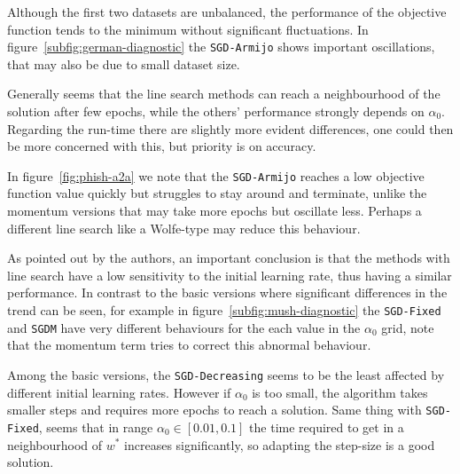 
Although the first two datasets are unbalanced, the performance of the objective function tends to the minimum without significant fluctuations. In figure~\ref{subfig:german-diagnostic} the \texttt{SGD-Armijo} shows important oscillations, that may also be due to small dataset size.


Generally seems that the line search methods can reach a neighbourhood of the solution after few epochs, while the others' performance strongly depends on $\alpha_0$. Regarding the run-time there are slightly more evident differences, one could then be more concerned with this, but priority is on accuracy.

In figure~\ref{fig:phish-a2a} we note that the \texttt{SGD-Armijo} reaches a low objective function value quickly but struggles to stay around and terminate, unlike the momentum versions that may take more epochs but oscillate less. Perhaps a different line search like a Wolfe-type may reduce this behaviour.

As pointed out by the authors, an important conclusion is that the methods with line search have a low sensitivity to the initial learning rate, thus having a similar performance. In contrast to the basic versions where significant differences in the trend can be seen, for example in figure~\ref{subfig:mush-diagnostic} the \texttt{SGD-Fixed} and \texttt{SGDM} have very different behaviours for the each value in the $\alpha_0$ grid, note that the momentum term tries to correct this abnormal behaviour.

Among the basic versions, the \texttt{SGD-Decreasing} seems to be the least affected by different initial learning rates. However if $\alpha_0$ is too small, the algorithm takes smaller steps and requires more epochs to reach a solution. Same thing with \texttt{SGD-Fixed}, seems that in range $\alpha_0\in[0.01,0.1]$ the time required to get in a neighbourhood of $w^\ast$ increases significantly, so adapting the step-size is a good solution.

